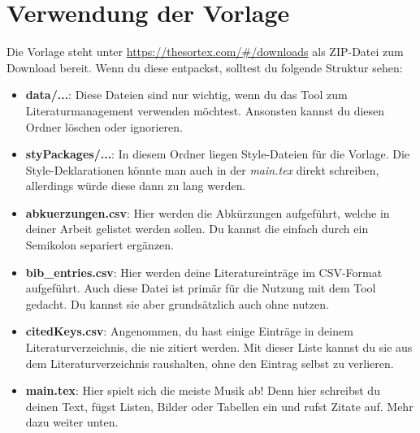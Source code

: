 \documentclass[12pt]{article}
\begin{document}
\part{Verwendung der Vorlage}
Die Vorlage steht unter \url{https://thesortex.com/#/downloads} als ZIP-Datei zum Download bereit. Wenn du diese entpackst, solltest du folgende Struktur sehen:
\begin{itemize}
\setlength\itemsep{.15em}
\item \textbf{data/...}: Diese Dateien sind nur wichtig, wenn du das Tool zum Literaturmanagement verwenden möchtest. Ansonsten kannst du diesen Ordner löschen oder ignorieren.
\item \textbf{styPackages/...}: In diesem Ordner liegen Style-Dateien für die Vorlage. Die Style-Deklarationen könnte man auch in der \textit{main.tex} direkt schreiben, allerdings würde diese dann zu lang werden.
\item \textbf{abkuerzungen.csv}: Hier werden die Abkürzungen aufgeführt, welche in deiner Arbeit gelistet werden sollen. Du kannst die einfach durch ein Semikolon separiert ergänzen.
\item \textbf{bib{\_}entries.csv}: Hier werden deine Literatureinträge im CSV-Format aufgeführt. Auch diese Datei ist primär für die Nutzung mit dem Tool gedacht. Du kannst sie aber grundsätzlich auch ohne nutzen.
\item \textbf{citedKeys.csv}: Angenommen, du hast einige Einträge in deinem Literaturverzeichnis, die nie zitiert werden. Mit dieser Liste kannst du sie aus dem Literaturverzeichnis raushalten, ohne den Eintrag selbst zu verlieren.
\item \textbf{main.tex}: Hier spielt sich die meiste Musik ab! Denn hier schreibst du deinen Text, fügst Listen, Bilder oder Tabellen ein und rufst Zitate auf. Mehr dazu weiter unten.
\end{itemize}
\end{document}
